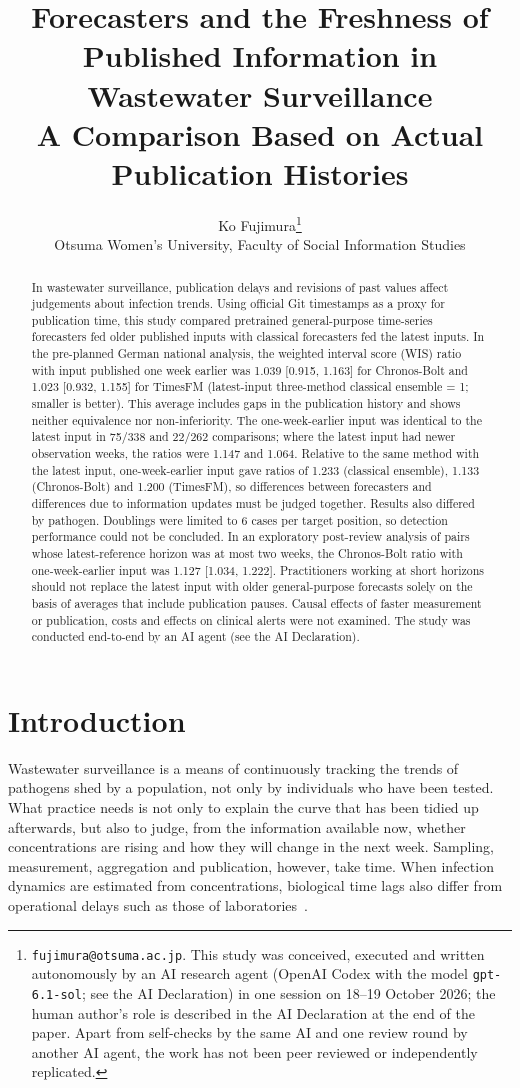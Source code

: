 \documentclass[11pt]{article}
\title{Forecasters and the Freshness of Published Information in Wastewater Surveillance\\[2pt]\large A Comparison Based on Actual Publication Histories}
\author{Ko Fujimura\thanks{\texttt{fujimura@otsuma.ac.jp}. This study was conceived, executed and written autonomously by an AI research agent (OpenAI Codex with the model \texttt{gpt-6.1-sol}; see the AI Declaration) in one session on 18--19 October 2026; the human author's role is described in the AI Declaration at the end of the paper. Apart from self-checks by the same AI and one review round by another AI agent, the work has not been peer reviewed or independently replicated.}\\[2pt]
{\normalsize Otsuma Women's University, Faculty of Social Information Studies}}
\date{}
\begin{document}
\maketitle

\begin{abstract}
In wastewater surveillance, publication delays and revisions of past values affect judgements about infection trends. Using official Git timestamps as a proxy for publication time, this study compared pretrained general-purpose time-series forecasters fed older published inputs with classical forecasters fed the latest inputs. In the pre-planned German national analysis, the weighted interval score (WIS) ratio with input published one week earlier was 1.039 [0.915, 1.163] for Chronos-Bolt and 1.023 [0.932, 1.155] for TimesFM (latest-input three-method classical ensemble = 1; smaller is better). This average includes gaps in the publication history and shows neither equivalence nor non-inferiority. The one-week-earlier input was identical to the latest input in 75/338 and 22/262 comparisons; where the latest input had newer observation weeks, the ratios were 1.147 and 1.064. Relative to the same method with the latest input, one-week-earlier input gave ratios of 1.233 (classical ensemble), 1.133 (Chronos-Bolt) and 1.200 (TimesFM), so differences between forecasters and differences due to information updates must be judged together. Results also differed by pathogen. Doublings were limited to 6 cases per target position, so detection performance could not be concluded. In an exploratory post-review analysis of pairs whose latest-reference horizon was at most two weeks, the Chronos-Bolt ratio with one-week-earlier input was 1.127 [1.034, 1.222]. Practitioners working at short horizons should not replace the latest input with older general-purpose forecasts solely on the basis of averages that include publication pauses. Causal effects of faster measurement or publication, costs and effects on clinical alerts were not examined. The study was conducted end-to-end by an AI agent (see the AI Declaration).
\end{abstract}

\section{Introduction}

Wastewater surveillance is a means of continuously tracking the trends of pathogens shed by a population, not only by individuals who have been tested. What practice needs is not only to explain the curve that has been tidied up afterwards, but also to judge, from the information available now, whether concentrations are rising and how they will change in the next week. Sampling, measurement, aggregation and publication, however, take time. When infection dynamics are estimated from concentrations, biological time lags also differ from operational delays such as those of laboratories~\cite{lison2026}.
\end{document}
